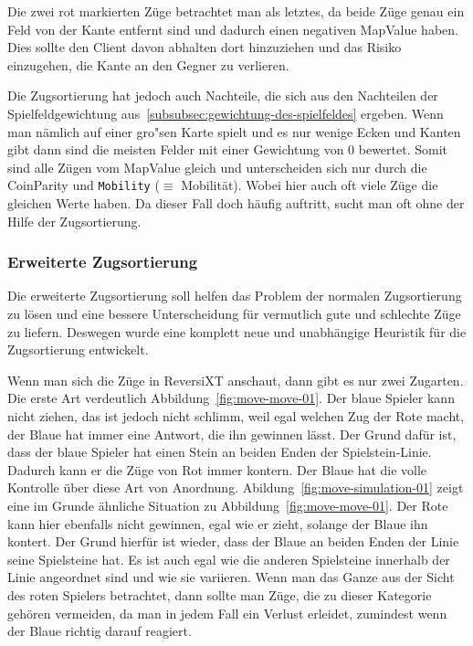 Die zwei rot markierten Z\"uge betrachtet man als letztes, da beide Z\"uge genau ein Feld von der Kante entfernt sind und dadurch einen negativen MapValue haben.
Dies sollte den Client davon abhalten dort hinzuziehen und das Risiko einzugehen, die Kante an den Gegner zu verlieren.

Die Zugsortierung hat jedoch auch Nachteile, die sich aus den Nachteilen der Spielfeldgewichtung aus~\ref{subsubsec:gewichtung-des-spielfeldes} ergeben.
Wenn man n\"amlich auf einer gro"sen Karte spielt und es nur wenige Ecken und Kanten gibt dann sind die meisten Felder mit einer Gewichtung von $0$ bewertet.
Somit sind alle Z\"ugen vom MapValue gleich und unterscheiden sich nur durch die CoinParity und \texttt{Mobility} ($\equiv$ Mobilit\"at).
Wobei hier auch oft viele Z\"uge die gleichen Werte haben.
Da dieser Fall doch h\"aufig auftritt, sucht man oft ohne der Hilfe der Zugsortierung.

\subsubsection{Erweiterte Zugsortierung}
Die erweiterte Zugsortierung soll helfen das Problem der normalen Zugsortierung zu l\"osen und eine bessere Unterscheidung f\"ur vermutlich gute und schlechte Z\"uge zu liefern.
Deswegen wurde eine komplett neue und unabh\"angige Heuristik f\"ur die Zugsortierung entwickelt.

Wenn man sich die Z\"uge in ReversiXT anschaut, dann gibt es nur zwei Zugarten.
Die erste Art verdeutlich Abbildung~\ref{fig:move-move-01}.
Der blaue Spieler kann nicht ziehen, das ist jedoch nicht schlimm, weil egal welchen Zug der Rote macht, der Blaue hat immer eine Antwort, die ihn gewinnen l\"asst.
Der Grund daf\"ur ist, dass der blaue Spieler hat einen Stein an beiden Enden der Spielstein-Linie.
Dadurch kann er die Z\"uge von Rot immer kontern.
Der Blaue hat die volle Kontrolle \"uber diese Art von Anordnung.
Abildung~\ref{fig:move-simulation-01} zeigt eine im Grunde \"ahnliche Situation zu Abbildung~\ref{fig:move-move-01}.
Der Rote kann hier ebenfalls nicht gewinnen, egal wie er zieht, solange der Blaue ihn kontert.
Der Grund hierf\"ur ist wieder, dass der Blaue an beiden Enden der Linie seine Spielsteine hat.
Es ist auch egal wie die anderen Spielsteine innerhalb der Linie angeordnet sind und wie sie variieren.
Wenn man das Ganze aus der Sicht des roten Spielers betrachtet, dann sollte man Z\"uge, die zu dieser Kategorie geh\"oren vermeiden, da man in jedem Fall ein Verlust erleidet, zumindest wenn der Blaue richtig darauf reagiert.

